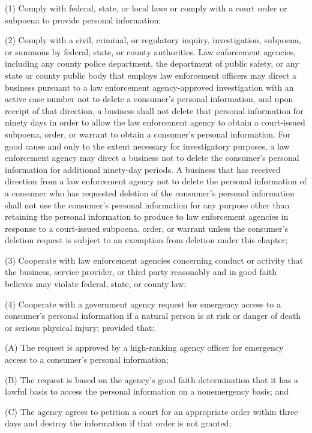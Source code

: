      (1)  Comply with federal, state, or local laws or comply with a court order or subpoena to provide personal information;

     (2)  Comply with a civil, criminal, or regulatory inquiry, investigation, subpoena, or summons by federal, state, or county authorities.  Law enforcement agencies, including any county police department, the department of public safety, or any state or county public body that employs law enforcement officers may direct a business pursuant to a law enforcement agency‑approved investigation with an active case number not to delete a consumer's personal information, and upon receipt of that direction, a business shall not delete that personal information for ninety days in order to allow the law enforcement agency to obtain a court-issued subpoena, order, or warrant to obtain a consumer's personal information.  For good cause and only to the extent necessary for investigatory purposes, a law enforcement agency may direct a business not to delete the consumer's personal information for additional ninety-day periods.  A business that has received direction from a law enforcement agency not to delete the personal information of a consumer who has requested deletion of the consumer's personal information shall not use the consumer's personal information for any purpose other than retaining the personal information to produce to law enforcement agencies in response to a court-issued subpoena, order, or warrant unless the consumer's deletion request is subject to an exemption from deletion under this chapter;

     (3)  Cooperate with law enforcement agencies concerning conduct or activity that the business, service provider, or third party reasonably and in good faith believes may violate federal, state, or county law;

     (4)  Cooperate with a government agency request for emergency access to a consumer's personal information if a natural person is at risk or danger of death or serious physical injury; provided that:

          (A)  The request is approved by a high-ranking agency officer for emergency access to a consumer's personal information;

          (B)  The request is based on the agency's good faith determination that it has a lawful basis to access the personal information on a nonemergency basis; and

          (C)  The agency agrees to petition a court for an appropriate order within three days and destroy the information if that order is not granted;

